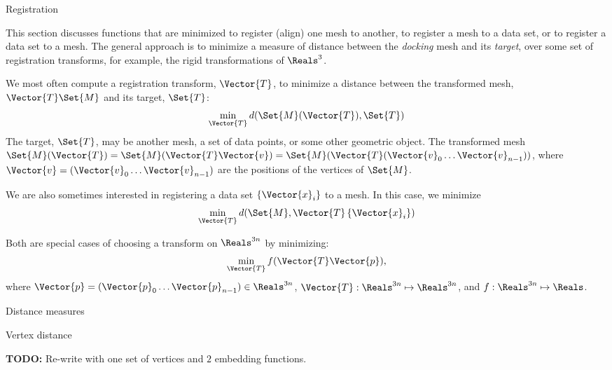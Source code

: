 \begin{plSection}{Registration}
\label{sec:registration}

This section discusses functions that are minimized
to register (align) one mesh to another,
to register a mesh to a data set,
or to register a data set to a mesh.
The general approach is to minimize
a measure of distance between the {\it docking} mesh and its {\it target},
over some set of registration transforms,
for example, the rigid transformations of $\Reals^3$.

We most often compute a registration transform, $\Vector{T}$,
to minimize a distance between the transformed mesh,
$\Vector{T}\Set{M}$ and its target, $\Set{T}$:
\begin{equation}
\min_{\Vector{T}} d(\Set{M}(\Vector{T}),\Set{T})
\end{equation}
The target, $\Set{T}$, may be another mesh, a set of data points,
or some other geometric object.
The transformed mesh
$\Set{M}(\Vector{T})
 = \Set{M}(\Vector{T}\Vector{v}) 
 = \Set{M}(\Vector{T}(\Vector{v}_0 \ldots \Vector{v}_{n-1}))$,
where $\Vector{v} = (\Vector{v}_0 \ldots  \Vector{v}_{n-1})$
are the positions of the vertices of $\Set{M}$.

We are also sometimes interested in registering a data set
$\left\{ \Vector{x}_i \right\}$ to a mesh.
In this case, we minimize
\begin{equation}
\min_{\Vector{T}} d(\Set{M},\Vector{T}\left\{\Vector{x}_i\right\})
\end{equation}

Both are special cases of choosing a transform on $\Reals^{3n}$
by minimizing:
\begin{equation}
\min_{\Vector{T}} f( \Vector{T} \Vector{p}),
\end{equation}
where
$\Vector{p} = (\Vector{p}_0 \ldots  \Vector{p}_{n-1}) \in \Reals^{3n}$,
$\Vector{T} : \Reals^{3n} \mapsto \Reals^{3n}$,
and
$f : \Reals^{3n} \mapsto \Reals$.

\begin{plSection}{Distance measures}
\label{sec:Distance-measures}

\begin{plSection}{Vertex distance}
\label{sec:Vertex-distance}

\textbf{TODO:} Re-write with one set of vertices and $2$
embedding functions.


\end{plSection}
\end{plSection}
\end{plSection}
